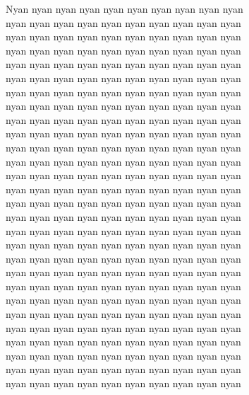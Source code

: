 \vspace{10pt}
Nyan nyan nyan nyan nyan nyan nyan nyan nyan nyan\\
nyan nyan nyan nyan nyan nyan nyan nyan nyan nyan\\
nyan nyan nyan nyan nyan nyan nyan nyan nyan nyan\\
nyan nyan nyan nyan nyan nyan nyan nyan nyan nyan\\
nyan nyan nyan nyan nyan nyan nyan nyan nyan nyan\\
nyan nyan nyan nyan nyan nyan nyan nyan nyan nyan\\
nyan nyan nyan nyan nyan nyan nyan nyan nyan nyan\\
nyan nyan nyan nyan nyan nyan nyan nyan nyan nyan\\
nyan nyan nyan nyan nyan nyan nyan nyan nyan nyan\\
nyan nyan nyan nyan nyan nyan nyan nyan nyan nyan\\
nyan nyan nyan nyan nyan nyan nyan nyan nyan nyan\\
nyan nyan nyan nyan nyan nyan nyan nyan nyan nyan\\
nyan nyan nyan nyan nyan nyan nyan nyan nyan nyan\\
nyan nyan nyan nyan nyan nyan nyan nyan nyan nyan\\
nyan nyan nyan nyan nyan nyan nyan nyan nyan nyan\\
nyan nyan nyan nyan nyan nyan nyan nyan nyan nyan\\
nyan nyan nyan nyan nyan nyan nyan nyan nyan nyan\\
nyan nyan nyan nyan nyan nyan nyan nyan nyan nyan\\
nyan nyan nyan nyan nyan nyan nyan nyan nyan nyan\\
nyan nyan nyan nyan nyan nyan nyan nyan nyan nyan\\
nyan nyan nyan nyan nyan nyan nyan nyan nyan nyan\\
nyan nyan nyan nyan nyan nyan nyan nyan nyan nyan\\
nyan nyan nyan nyan nyan nyan nyan nyan nyan nyan\\
nyan nyan nyan nyan nyan nyan nyan nyan nyan nyan\\
nyan nyan nyan nyan nyan nyan nyan nyan nyan nyan\\
nyan nyan nyan nyan nyan nyan nyan nyan nyan nyan\\
nyan nyan nyan nyan nyan nyan nyan nyan nyan nyan\\
nyan nyan nyan nyan nyan nyan nyan nyan nyan nyan\\
